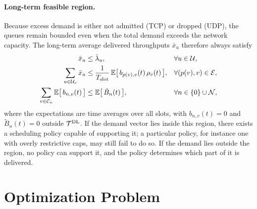\begin{EnChapter}
\paragraph{Long-term feasible region.}
Because excess demand is either not admitted (TCP) or dropped (UDP), the queues
remain bounded even when the total demand exceeds the network capacity. The
long-term average delivered throughputs $\bar x_u$ therefore always satisfy
\begin{align}
  \bar x_u &\le \bar\lambda_u, && \forall u \in \mathcal{U}, \label{eq:demand} \\
  \sum_{u \in \mathcal{U}_v} \bar x_u &\le \frac{1}{T_{\mathrm{slot}}}\, \mathbb{E}\bigl[\, b_{p(v),v}(t)\, \rho_v(t) \,\bigr], && \forall (p(v),v) \in \mathcal{E}, \label{eq:link-cap} \\
  \sum_{v \in \mathcal{C}_n} \mathbb{E}\bigl[\, b_{n,v}(t) \,\bigr] &\le \mathbb{E}\bigl[\, \tilde B_n(t) \,\bigr], && \forall n \in \{0\} \cup \mathcal{N}, \label{eq:node-cap}
\end{align}
where the expectations are time averages over all slots, with $b_{n,v}(t) = 0$ and
$\tilde B_n(t) = 0$ outside $\mathcal{T}^{\mathrm{DL}}$. If the demand vector lies inside
this region, there exists a scheduling policy capable of supporting it; a
particular policy, for instance one with overly restrictive caps, may still fail to
do so. If the demand lies outside the region, no policy can support it, and the
policy determines which part of it is delivered.

\section{Optimization Problem}
\label{subsec:problem}


\end{EnChapter}
